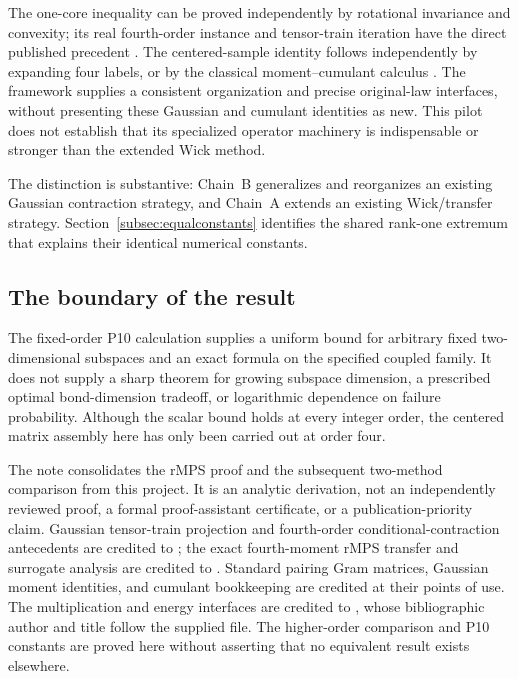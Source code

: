 \documentclass[11pt]{article}
\numberwithin{equation}{section}
\theoremstyle{definition}\newtheorem{definition}[theorem]{Definition}
\theoremstyle{remark}\newtheorem{remark}[theorem]{Remark}
\begin{document}
The one-core inequality can be proved independently by rotational invariance
and convexity; its real fourth-order instance and tensor-train iteration have
the direct published precedent \cite[Section~5.1]{RR2020}. The centered-sample
identity follows independently by expanding four labels, or by the classical
moment--cumulant calculus \cite{McCullagh}. The framework supplies a consistent
organization and precise original-law interfaces, without presenting these
Gaussian and cumulant identities as new. This pilot does not establish that its specialized
operator machinery is indispensable or stronger than the extended Wick method.

The distinction is substantive: Chain~B generalizes and reorganizes an existing
Gaussian contraction strategy, and Chain~A extends an existing Wick/transfer
strategy. Section~\ref{subsec:equalconstants} identifies the shared rank-one
extremum that explains their identical numerical constants.

\subsection{The boundary of the result}
The fixed-order P10 calculation supplies a uniform bound for arbitrary fixed
two-dimensional subspaces and an exact formula on the specified coupled family.
It does not supply a sharp theorem for growing subspace dimension, a prescribed
optimal bond-dimension tradeoff, or logarithmic dependence on failure probability.
Although the scalar bound holds at every integer order, the centered matrix
assembly here has only been carried out at order four.

The note consolidates the rMPS proof and the subsequent two-method comparison
from this project. It is an analytic derivation, not an independently reviewed
proof, a formal proof-assistant certificate, or a publication-priority claim.
Gaussian tensor-train projection and fourth-order conditional-contraction
antecedents are credited to \cite{RR2020}; the exact fourth-moment rMPS transfer
and surrogate analysis are credited to \cite{CEMT}. Standard pairing Gram
matrices, Gaussian moment identities, and cumulant bookkeeping are credited at
their points of use. The multiplication and energy interfaces are credited to
\cite{Framework}, whose bibliographic author and title follow the supplied file.
The higher-order comparison and P10 constants are proved here without asserting
that no equivalent result exists elsewhere.

\par{}
\appendix
\end{document}
